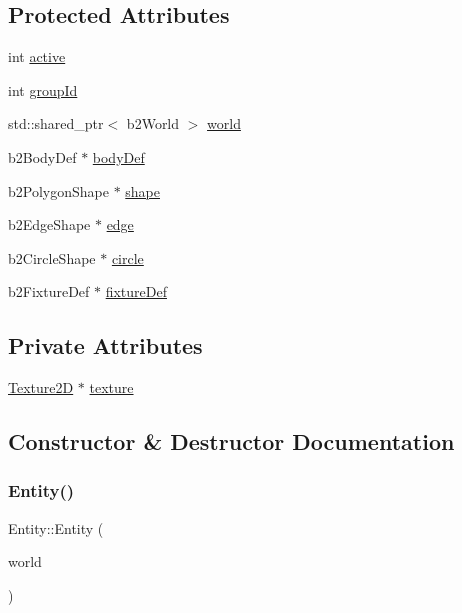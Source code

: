 \subsection*{Protected Attributes}
\begin{DoxyCompactItemize}
\item 
int \hyperlink{classEntity_aeb5d37f9e2951abb86bb82f1875438a7}{active}
\item 
int \hyperlink{classEntity_a3caf6ab17eedfd51abe34e636ef9511f}{group\+Id}
\item 
std\+::shared\+\_\+ptr$<$ b2\+World $>$ \hyperlink{classEntity_a83af93b5af6170706ebedb406caae509}{world}
\item 
b2\+Body\+Def $\ast$ \hyperlink{classEntity_a84add379cdb92213cb236ea740a9c255}{body\+Def}
\item 
b2\+Polygon\+Shape $\ast$ \hyperlink{classEntity_ab8d8aadc7e72bc705718982d4804f491}{shape}
\item 
b2\+Edge\+Shape $\ast$ \hyperlink{classEntity_a0da995c93abd009e3a35bfb173526eaf}{edge}
\item 
b2\+Circle\+Shape $\ast$ \hyperlink{classEntity_aff413506dfd893191af8732c9acf28b0}{circle}
\item 
b2\+Fixture\+Def $\ast$ \hyperlink{classEntity_ac4eb27d6eca629016575130b40273a4b}{fixture\+Def}
\end{DoxyCompactItemize}
\subsection*{Private Attributes}
\begin{DoxyCompactItemize}
\item 
\hyperlink{classTexture2D}{Texture2D} $\ast$ \hyperlink{classEntity_a890913a7b3f4099622615ef0d589df77}{texture}
\end{DoxyCompactItemize}


\subsection{Constructor \& Destructor Documentation}
\mbox{\label{classEntity_a921d3ec8d8b5f758f82af131847b6edb}} 
\subsubsection{\texorpdfstring{Entity()}{Entity()}}
{\footnotesize\ttfamily Entity\+::\+Entity (\begin{DoxyParamCaption}\item[{std\+::shared\+\_\+ptr$<$ b2\+World $>$}]{world }\end{DoxyParamCaption})}

